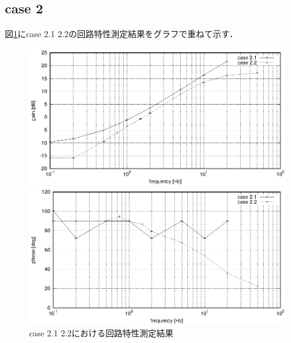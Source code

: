 \documentclass[dvipdfmx,titlepage,a4j]{jsarticle}  %
\begin{document}
\subsection{case 2}
図\ref{fig:gr:case2}にcase 2.1 2.2の回路特性測定結果をグラフで重ねて示す．
\begin{figure}[H]
  \centering
  \begin{minipage}{8cm}
    \centering
    \includegraphics[keepaspectratio, scale=0.6]{../data/case2-g.eps}
  \end{minipage}
  \begin{minipage}{8cm}
    \centering
    \includegraphics[keepaspectratio, scale=0.6]{../data/case2-f.eps}
  \end{minipage}
  \caption{case 2.1 2.2における回路特性測定結果}
  \label{fig:gr:case2}
\end{figure}
\end{document}
